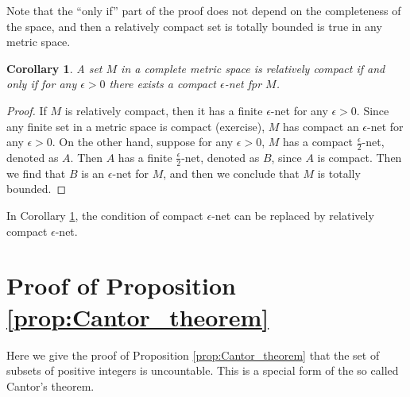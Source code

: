 \documentclass[a4paper,12pt]{article}
\newtheorem{cor}[thm]{Corollary}
\theoremstyle{definition}
\theoremstyle{remark}
\begin{document}
Note that the ``only if'' part of the proof does not depend on the completeness of the space, and then a relatively compact set is totally bounded is true in any metric space.

\begin{cor} \label{cor:compact_epsilon_net}
  A set $M$ in a complete metric space is relatively compact if and only if for any $\epsilon > 0$ there exists a compact $\epsilon$-net fpr $M$.
\end{cor}

\begin{proof}
  If $M$ is relatively compact, then it has a finite $\epsilon$-net for any $\epsilon > 0$. Since any finite set in a metric space is compact (exercise), $M$ has compact an $\epsilon$-net for any $\epsilon > 0$. On the other hand, suppose for any $\epsilon > 0$, $M$ has a compact $\frac{\epsilon}{2}$-net, denoted as $A$. Then $A$ has a finite $\frac{\epsilon}{2}$-net, denoted as $B$, since $A$ is compact. Then we find that $B$ is an $\epsilon$-net for $M$, and then we conclude that $M$ is totally bounded.
\end{proof}
In Corollary \ref{cor:compact_epsilon_net}, the condition of compact $\epsilon$-net can be replaced by relatively compact $\epsilon$-net.

\appendix

\section{Proof of Proposition \ref{prop:Cantor_theorem}} \label{sec:proof_of_Cantor_theorem}

Here we give the proof of Proposition \ref{prop:Cantor_theorem} that the set of subsets of positive integers is uncountable. This is a special form of the so called Cantor's theorem.
\end{document}
